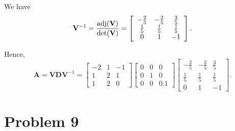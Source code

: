 \documentclass[12pt,a4paper]{article}
\begin{document}
\begin{solution}
We have
\[
\mathbf{V}^{-1} = \frac{\operatorname{adj}(\mathbf{V})}{\det(\mathbf{V})}
=
\left[\begin{array}{ccc}
-\frac{2}{5} & -\frac{2}{5} & \frac{3}{5} \\
\frac{1}{5} & \frac{1}{5} & \frac{1}{5} \\
0 & 1 & -1
\end{array}\right].
\]

Hence,
\[
\mathbf{A} = 
\mathbf{V}\mathbf{D}\mathbf{V}^{-1}
=
\begin{bmatrix}
    -2 & 1 & -1\\
    1 & 2 & 1\\
    1 & 2 & 0
\end{bmatrix}
\begin{bmatrix}
    0 & 0 & 0\\
    0 & 1 & 0\\
    0 & 0 & 0.1
\end{bmatrix}
\left[\begin{array}{ccc}
-\frac{2}{5} & -\frac{2}{5} & \frac{3}{5} \\
\frac{1}{5} & \frac{1}{5} & \frac{1}{5} \\
0 & 1 & -1
\end{array}\right].
\]
\end{solution}


\section*{Problem 9}
\end{document}
